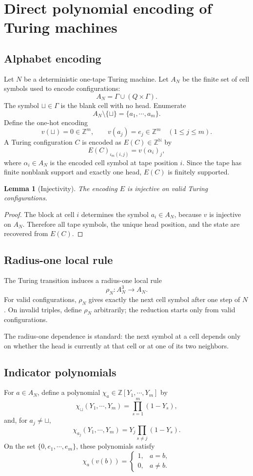 \documentclass{amsart}
\newtheorem{lemma}[theorem]{Lemma}
\theoremstyle{definition}
\theoremstyle{remark}
\numberwithin{equation}{section}
\newcommand{\Z}{\mathbb{Z}}
\newcommand{\N}{\mathbb{N}}
\begin{document}
\section{Direct polynomial encoding of Turing machines}

\subsection{Alphabet encoding}
Let $N$ be a deterministic one-tape Turing machine.
Let $A_N$ be the finite set of cell symbols used to encode configurations:
\[A_N=\Gamma\cup(Q\times\Gamma).\]
The symbol $\sqcup\in\Gamma$ is the blank cell with no head.
Enumerate
\[A_N\setminus\{\sqcup\}=\{a_1,\cdots,a_m\}.\]
Define the one-hot encoding
\[v(\sqcup)=0\in\Z^m,\qquad v(a_j)=e_j\in\Z^m\quad(1\le j\le m).\]
A Turing configuration $C$ is encoded as $E(C)\in\Z^\N$ by
\[E(C)_{\iota_m(i,j)}=v(\alpha_i)_j,\]
where $\alpha_i\in A_N$ is the encoded cell symbol at tape position $i$.
Since the tape has finite nonblank support and exactly one head, $E(C)$ is finitely supported.
\begin{lemma}[Injectivity]\label{lem_inj}
The encoding $E$ is injective on valid Turing configurations.
\end{lemma}
\begin{proof}
The block at cell $i$ determines the symbol $a_i\in A_N$, because $v$ is injective on $A_N$.
Therefore all tape symbols, the unique head position, and the state are recovered from $E(C)$.
\end{proof}


\subsection{Radius-one local rule}
The Turing transition induces a radius-one local rule
\[\rho_N:A_N^3\to A_N.\]
For valid configurations, $\rho_N$ gives exactly the next cell symbol after one step of $N$.
On invalid triples, define $\rho_N$ arbitrarily; the reduction starts only from valid configurations.

The radius-one dependence is standard: the next symbol at a cell depends only on whether the head is currently at that cell or at one of its two neighbors.

\subsection{Indicator polynomials}
For $a\in A_N$, define a polynomial $\chi_a\in\Z[Y_1,\cdots,Y_m]$ by
\[\chi_{\sqcup}(Y_1,\cdots,Y_m)=\prod^m_{s=1}(1-Y_s),\]
and, for $a_j\neq\sqcup,$
\[\chi_{a_j}(Y_1,\cdots,Y_m)=Y_j\prod_{s\neq j}(1-Y_s).\]
On the set $\{0,e_1,\cdots,e_m\}$, these polynomials satisfy
\[\chi_a(v(b))=
\begin{cases}
1, & a=b, \\
0, & a\ne b.
\end{cases}\]
\end{document}

